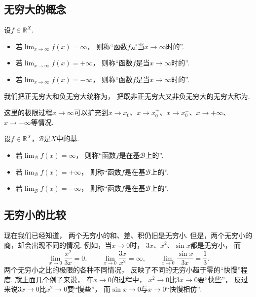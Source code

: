 \subsection{无穷大的概念}
\begin{definition}
设\(f\in\mathbb{R}^X\).
\begin{itemize}
	\item 若\(\lim_{x\to\infty} f(x) = \infty\)，
	则称“函数\(f\)是当\(x\to\infty\)时的”.

	\item 若\(\lim_{x\to\infty} f(x) = +\infty\)，
	则称“函数\(f\)是当\(x\to\infty\)时的”.

	\item 若\(\lim_{x\to\infty} f(x) = -\infty\)，
	则称“函数\(f\)是当\(x\to\infty\)时的”.
\end{itemize}
我们把正无穷大和负无穷大统称为，
把既非正无穷大又非负无穷大的无穷大称为.
\end{definition}
这里的极限过程\(x \to \infty\)可以扩充到\(x \to x_0\)、\(x \to x_0^+\)、\(x \to x_0^-\)、\(x \to +\infty\)、\(x \to -\infty\)等情况.

\begin{definition}
设\(f\in\mathbb{R}^X\)，\(\mathcal{B}\)是\(X\)中的基.
\begin{itemize}
	\item 若\(\lim_\mathcal{B} f(x) = \infty\)，
	则称“函数\(f\)是在基\(\mathcal{B}\)上的”.

	\item 若\(\lim_\mathcal{B} f(x) = +\infty\)，
	则称“函数\(f\)是在基\(\mathcal{B}\)上的”.

	\item 若\(\lim_\mathcal{B} f(x) = -\infty\)，
	则称“函数\(f\)是在基\(\mathcal{B}\)上的”.
\end{itemize}
\end{definition}

\subsection{无穷小的比较}
现在我们已经知道，
两个无穷小的和、差、积仍旧是无穷小.
但是，两个无穷小的商，却会出现不同的情况.
例如，当\(x\to0\)时，
\(3x\)、\(x^2\)、\(\sin x\)都是无穷小，
而\begin{equation*}
	\lim_{x\to0}\frac{x^2}{3x}=0, \qquad
	\lim_{x\to0}\frac{3x}{x^2}=\infty, \qquad
	\lim_{x\to0}\frac{\sin x}{3x}=\frac{1}{3}.
\end{equation*}
两个无穷小之比的极限的各种不同情况，
反映了不同的无穷小趋于零的“快慢”程度.
就上面几个例子来说，
在\(x\to0\)的过程中，
\(x^2\to0\)比\(3x\to0\)要“快些”，
反过来说\(3x\to0\)比\(x^2\to0\)要“慢些”，
而\(\sin x\to0\)与\(x\to0\)“快慢相仿”.

